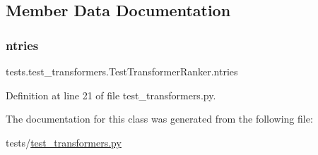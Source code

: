\subsection{Member Data Documentation}
\mbox{\label{classtests_1_1test__transformers_1_1TestTransformerRanker_ac580716d99f1d6e925acdf3deee22def}} 
\subsubsection{\texorpdfstring{ntries}{ntries}}
{\footnotesize\ttfamily tests.\+test\+\_\+transformers.\+Test\+Transformer\+Ranker.\+ntries\hspace{0.3cm}{\ttfamily [static]}}



Definition at line 21 of file test\+\_\+transformers.\+py.



The documentation for this class was generated from the following file\+:\begin{DoxyCompactItemize}
\item 
tests/\hyperlink{test__transformers_8py}{test\+\_\+transformers.\+py}\end{DoxyCompactItemize}
